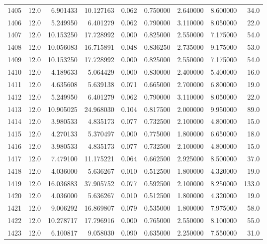 \begin{tabular}{lrrrrrrrr}
1405 &   12.0 &   6.901433 &  10.127163 &  0.062 &  0.750000 &  2.640000 &   8.600000 &   34.0 \\
1406 &   12.0 &   5.249950 &   6.401279 &  0.062 &  0.790000 &  3.110000 &   8.050000 &   22.0 \\
1407 &   12.0 &  10.153250 &  17.728992 &  0.000 &  0.825000 &  2.550000 &   7.175000 &   54.0 \\
1408 &   12.0 &  10.056083 &  16.715891 &  0.048 &  0.836250 &  2.735000 &   9.175000 &   53.0 \\
1409 &   12.0 &  10.153250 &  17.728992 &  0.000 &  0.825000 &  2.550000 &   7.175000 &   54.0 \\
1410 &   12.0 &   4.189633 &   5.064429 &  0.000 &  0.830000 &  2.400000 &   5.400000 &   16.0 \\
1411 &   12.0 &   4.635608 &   5.639138 &  0.071 &  0.665000 &  2.700000 &   6.800000 &   19.0 \\
1412 &   12.0 &   5.249950 &   6.401279 &  0.062 &  0.790000 &  3.110000 &   8.050000 &   22.0 \\
1413 &   12.0 &  10.905025 &  24.968030 &  0.104 &  0.817500 &  2.000000 &   9.950000 &   89.0 \\
1414 &   12.0 &   3.980533 &   4.835173 &  0.077 &  0.732500 &  2.100000 &   4.800000 &   15.0 \\
1415 &   12.0 &   4.270133 &   5.370497 &  0.000 &  0.775000 &  1.800000 &   6.650000 &   18.0 \\
1416 &   12.0 &   3.980533 &   4.835173 &  0.077 &  0.732500 &  2.100000 &   4.800000 &   15.0 \\
1417 &   12.0 &   7.479100 &  11.175221 &  0.064 &  0.662500 &  2.925000 &   8.500000 &   37.0 \\
1418 &   12.0 &   4.036000 &   5.636267 &  0.010 &  0.512500 &  1.800000 &   4.320000 &   19.0 \\
1419 &   12.0 &  16.036883 &  37.905752 &  0.077 &  0.592500 &  2.100000 &   8.250000 &  133.0 \\
1420 &   12.0 &   4.036000 &   5.636267 &  0.010 &  0.512500 &  1.800000 &   4.320000 &   19.0 \\
1421 &   12.0 &   9.006292 &  16.869807 &  0.079 &  0.535000 &  1.800000 &   7.975000 &   58.0 \\
1422 &   12.0 &  10.278717 &  17.796916 &  0.000 &  0.765000 &  2.550000 &   8.100000 &   55.0 \\
1423 &   12.0 &   6.100817 &   9.058030 &  0.090 &  0.635000 &  2.250000 &   7.550000 &   31.0 \\

\end{tabular}
